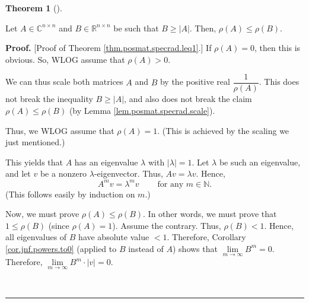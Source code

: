 \documentclass[numbers=enddot,12pt,final,onecolumn,notitlepage]{scrartcl}%
\numberwithin{exer}{subsection}
\theoremstyle{definition}
\newtheorem{theo}{Theorem}[subsection]
\newenvironment{theorem}[1][]
{\begin{theo}[#1]\begin{leftbar}}
{\end{leftbar}\end{theo}}
\newenvironment{proof}[1][Proof]{\noindent\textbf{#1.} }{\ \rule{0.5em}{0.5em}}
\begin{document}
\begin{theorem}
\label{thm.posmat.specrad.leq1}Let $A\in\mathbb{C}^{n\times n}$ and
$B\in\mathbb{R}^{n\times n}$ be such that $B\geq\left\vert A\right\vert $.
Then, $\rho\left(  A\right)  \leq\rho\left(  B\right)  $.
\end{theorem}

\begin{proof}
[Proof of Theorem \ref{thm.posmat.specrad.leq1}.] If $\rho\left(  A\right)
=0$, then this is obvious. So, WLOG assume that $\rho\left(  A\right)  >0$.

We can thus scale both matrices $A$ and $B$ by the positive real $\dfrac
{1}{\rho\left(  A\right)  }$. This does not break the inequality
$B\geq\left\vert A\right\vert $, and also does not break the claim
$\rho\left(  A\right)  \leq\rho\left(  B\right)  $ (by Lemma
\ref{lem.posmat.specrad.scale}).

Thus, we WLOG assume that $\rho\left(  A\right)  =1$. (This is achieved by the
scaling we just mentioned.)

This yields that $A$ has an eigenvalue $\lambda$ with $\left\vert
\lambda\right\vert =1$. Let $\lambda$ be such an eigenvalue, and let $v$ be a
nonzero $\lambda$-eigenvector. Thus, $Av=\lambda v$. Hence,%
\begin{equation}
A^{m}v=\lambda^{m}v\ \ \ \ \ \ \ \ \ \ \text{for any }m\in\mathbb{N}%
.\label{pf.thm.posmat.specrad.leq1.Amv=}%
\end{equation}
(This follows easily by induction on $m$.)

Now, we must prove $\rho\left(  A\right)  \leq\rho\left(  B\right)  $. In
other words, we must prove that $1\leq\rho\left(  B\right)  $ (since
$\rho\left(  A\right)  =1$). Assume the contrary. Thus, $\rho\left(  B\right)
<1$. Hence, all eigenvalues of $B$ have absolute value $<1$. Therefore,
Corollary \ref{cor.jnf.powers.to0} (applied to $B$ instead of $A$) shows that
$\lim\limits_{m\rightarrow\infty}B^{m}=0$. Therefore, $\lim
\limits_{m\rightarrow\infty}B^{m}\cdot\left\vert v\right\vert =0$.


\end{proof}
\end{document}
